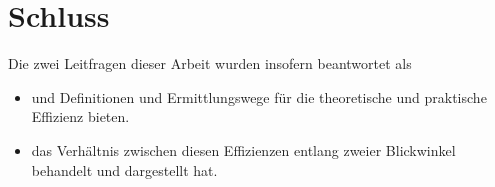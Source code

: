 \chapter*{Schluss}





Die zwei Leitfragen dieser Arbeit wurden insofern beantwortet als
\begin{itemize}
    \item {} und  Definitionen und Ermittlungswege für die theoretische und praktische Effizienz bieten.
    \item {} das Verhältnis zwischen diesen Effizienzen entlang zweier Blickwinkel behandelt und dargestellt hat.
\end{itemize}


